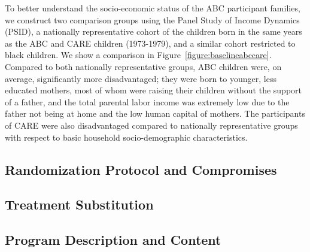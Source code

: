 \noindent To better understand the socio-economic status of the ABC participant families, we construct two comparison groups using the Panel Study of Income Dynamics (PSID), a nationally representative cohort of the children born in the same years as the ABC and CARE children (1973-1979), and a similar cohort restricted to black children. We show a comparison in Figure~\ref{figure:baselineabccare}. Compared to both nationally representative groups, ABC children were, on average, significantly more disadvantaged; they were born to younger, less educated mothers, most of whom were raising their children without the support of a father, and the total parental labor income was extremely low due to the father not being at home and the low human capital of mothers. The participants of CARE were also disadvantaged compared to nationally representative groups with respect to basic household socio-demographic characteristics.

\subsection{Randomization Protocol and Compromises}

\subsection{Treatment Substitution}

\subsection{Program Description and Content}

\clearpage
\singlespace



 
